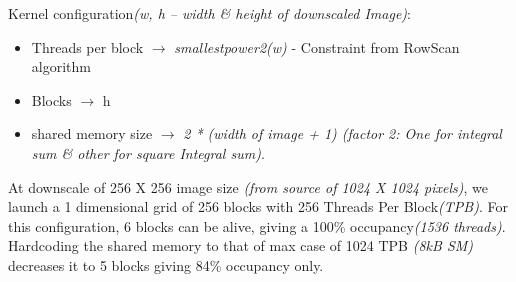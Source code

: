 \begin{itemize}
Kernel configuration\textit{(w, h – width \& height of downscaled Image)}:
\begin{itemize}
    \item Threads per block \begin{math}\rightarrow\end{math} \textit{smallestpower2(w)} - Constraint from RowScan algorithm
    \item Blocks \begin{math}\rightarrow\end{math} h
    \item shared memory size \begin{math}\rightarrow\end{math} \textit{2 * (width of image + 1) (factor 2: One for integral sum \& other for square Integral sum)}.
\end{itemize}
At downscale of 256 X 256 image size \textit{(from source of 1024 X 1024 pixels)}, we launch a 1 dimensional 
grid of 256 blocks with 256 Threads Per Block\textit{(TPB)}. For this configuration, 6 blocks can be alive, 
giving a 100\% occupancy\textit{(1536 threads)}. Hardcoding the shared memory to that of max case 
of 1024 TPB \textit{(8kB SM)} decreases it to 5 blocks giving 84\% occupancy only. 

\end{itemize}


